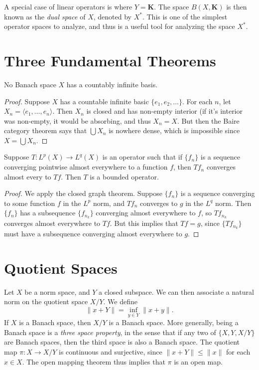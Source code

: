 A special case of linear operators is where $Y = \mathbf{K}$. The space $B(X,\mathbf{K})$ is then known as the {\it dual space} of $X$, denoted by $X^*$. This is one of the simplest operator spaces to analyze, and thus is a useful tool for analyzing the space $X^*$.

\section{Three Fundamental Theorems}

\begin{theorem}
    No Banach space $X$ has a countably infinite basis.
\end{theorem}
\begin{proof}
    Suppose $X$ has a countable infinite basic $\{ e_1, e_2, \dots \}$. For each $n$, let $X_n = \langle e_1, \dots, e_n \rangle$. Then $X_n$ is closed and has non-empty interior (if it's interior was non-empty, it would be absorbing, and thus $X_n = X$. But then the Baire category theorem says that $\bigcup X_n$ is nowhere dense, which is impossible since $X = \bigcup X_n$.
\end{proof}

\begin{theorem}
    Suppose $T: L^p(X) \to L^q(X)$ is an operator such that if $\{ f_n \}$ is a sequence converging pointwise almost everywhere to a function $f$, then $Tf_n$ converges almost every to $Tf$. Then $T$ is a bounded operator.
\end{theorem}
\begin{proof}
    We apply the closed graph theorem. Suppose $\{ f_n \}$ is a sequence converging to some function $f$ in the $L^p$ norm, and $Tf_n$ converges to $g$ in the $L^q$ norm. Then $\{ f_n \}$ has a subsequence $\{ f_{n_k} \}$ converging almost everywhere to $f$, so $Tf_{n_k}$ converges almost everywhere to $Tf$. But this implies that $Tf = g$, since $\{ Tf_{n_k} \}$ must have a subsequence converging almost everywhere to $g$.
\end{proof}

\section{Quotient Spaces}

Let $X$ be a norm space, and $Y$ a closed subspace. We can then associate a natural norm on the quotient space $X/Y$. We define
%
\[ \| x + Y \| = \inf_{y \in Y} \| x + y \|. \]
%
If $X$ is a Banach space, then $X/Y$ is a Banach space. More generally, being a Banach space is a {\it three space property}, in the sense that if any two of $\{ X, Y, X/Y \}$ are Banach spaces, then the third space is also a Banach space. The quotient map $\pi: X \to X/Y$ is continuous and surjective, since $\| x + Y \| \leq \| x \|$ for each $x \in X$. The open mapping theorem thus implies that $\pi$ is an open map.

